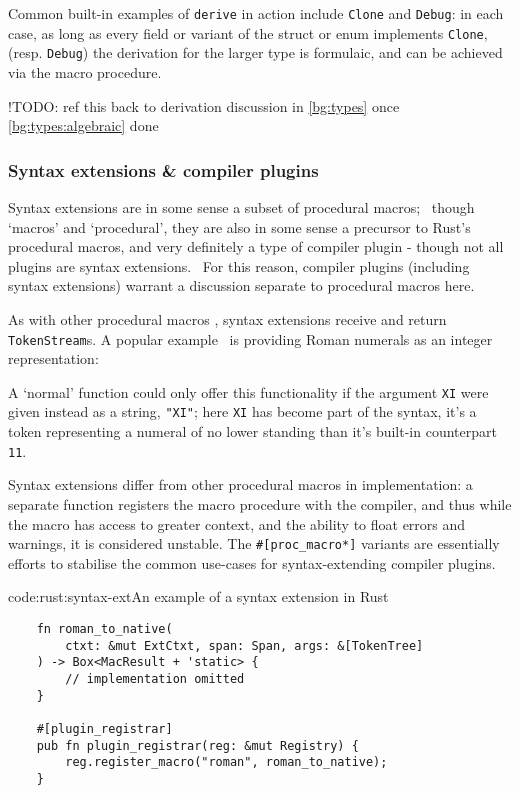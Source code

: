 Common built-in examples of \texttt{derive} in action include \texttt{Clone} and \texttt{Debug}: in each case, as long as every field or variant of the struct or enum implements \texttt{Clone}, (resp. \texttt{Debug}) the derivation for the larger type is formulaic, and can be achieved via the macro procedure.

!TODO: ref this back to derivation discussion in \cref{bg:types} once \cref{bg:types:algebraic} done

\subsubsection{Syntax extensions \& compiler plugins} \label{bg:rust:plugins}

Syntax extensions are in some sense a subset of procedural macros;~ \cite{rust_macros_whereweat} though `macros' and `procedural', they are also in some sense a precursor to Rust's procedural macros, and very definitely a type of compiler plugin - though not all plugins are syntax extensions.~\cite{rust_macros_overview} For this reason, compiler plugins (including syntax extensions) warrant a discussion separate to procedural macros here.

As with other procedural macros , syntax extensions receive and return \texttt{TokenStream}s. A popular example~\cite{rust_macros_overview, rust_book} is providing Roman numerals as an integer representation: 

A `normal' function could only offer this functionality if the argument \texttt{XI} were given instead as a string, \texttt{"XI"}; here \texttt{XI} has become part of the syntax, it's a token representing a numeral of no lower standing than it's built-in counterpart \texttt{11}.

Syntax extensions differ from other procedural macros in implementation: 
a separate function registers the macro procedure with the compiler, and thus while the macro has access to greater context, and the ability to float errors and warnings, it is considered unstable. The \texttt{#[proc_macro*]} variants are essentially efforts to stabilise the common use-cases for syntax-extending compiler plugins. \cite{rust_macros_overview, rust_book}

\begin{codelisting}{code:rust:syntax-ext}{An example of a syntax extension in Rust}
\begin{spacing}{\codespacing}
\begin{verbatim}
    fn roman_to_native(
        ctxt: &mut ExtCtxt, span: Span, args: &[TokenTree]
    ) -> Box<MacResult + 'static> {
        // implementation omitted
    }

    #[plugin_registrar]
    pub fn plugin_registrar(reg: &mut Registry) {
        reg.register_macro("roman", roman_to_native);
    }
\end{verbatim}
\end{spacing}
\end{codelisting} 

